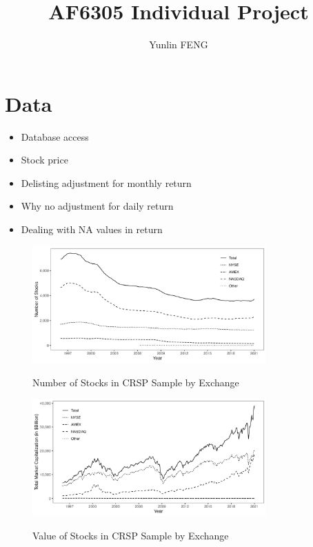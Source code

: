 \documentclass{article}
\author{Yunlin FENG}
\title{AF6305 Individual Project}
\begin{document}
\maketitle

\section{Data}

\begin{itemize}
  \item Database access
  \item Stock price
  \item Delisting adjustment for monthly return
  \item Why no adjustment for daily return
  \item Dealing with NA values in return
\end{itemize}

\pagebreak

\begin{figure}[htbp]
  \centering
  \caption{Number of Stocks in CRSP Sample by Exchange}
  \includegraphics[width=0.8\textwidth]{figs/stock_exchange_composition.png}
  \label{fig:stock_exchange_composition}
\end{figure}

\begin{figure}[htbp]
  \centering
  \caption{Value of Stocks in CRSP Sample by Exchange}
  \includegraphics[width=0.8\textwidth]{figs/value_of_stock_in_exchanges.png}
  \label{fig:value_of_stock_in_exchanges}
\end{figure}

















\end{document}
